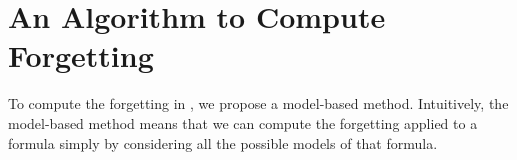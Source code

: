 \documentclass{article}
\begin{document}
%
%



\section{An Algorithm to Compute Forgetting}
To compute the forgetting in \CTL, we propose a model-based method.
Intuitively, the model-based method means that we can compute the forgetting applied to a formula  simply by considering all the possible models of that formula.

%
\end{document}
